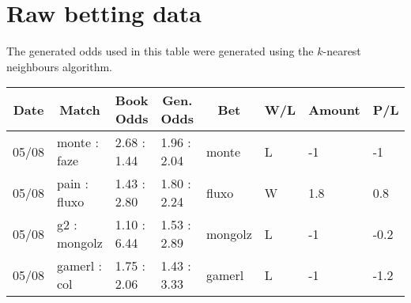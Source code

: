 
\chapter{Raw betting data} %

\label{dix:betting-data} %

The generated odds used in this table were generated using the $k$-nearest neighbours algorithm.

\begin{small}
\begin{longtable}{|l|l|l|l|l|l|l|l|}
	\hline
	\multicolumn{1}{|c|}{\textbf{Date}} & \multicolumn{1}{c|}{\textbf{Match}} & \multicolumn{1}{c|}{\textbf{Book Odds}} & \multicolumn{1}{c|}{\textbf{Gen. Odds}} & \multicolumn{1}{c|}{\textbf{Bet}} & \multicolumn{1}{c|}{\textbf{W/L}} & \multicolumn{1}{c|}{\textbf{Amount}} & \multicolumn{1}{c|}{\textbf{P/L}} \\ \hline
	\endhead
	05/08                               & monte : faze                        & 2.68 : 1.44                             & 1.96 : 2.04                             & monte                             & L                                 & -1                                   & -1                                \\ \hline
	05/08                               & pain : fluxo                        & 1.43 : 2.80                             & 1.80 : 2.24                             & fluxo                             & W                                 & 1.8                                  & 0.8                               \\ \hline
	05/08                               & g2 : mongolz                        & 1.10 : 6.44                             & 1.53 : 2.89                             & mongolz                           & L                                 & -1                                   & -0.2                              \\ \hline
	05/08                               & gamerl : col                        & 1.75 : 2.06                             & 1.43 : 3.33                             & gamerl                            & L                                 & -1                                   & -1.2                              \\ \hline

\end{longtable}
\end{small}
